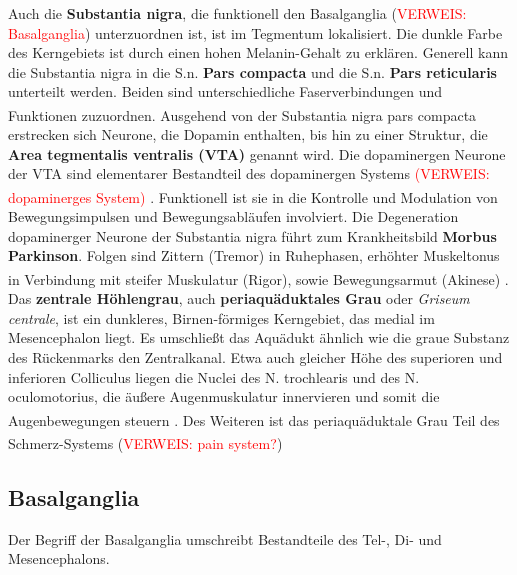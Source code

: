 \documentclass[12pt,a4paper,pdftex]{article}
\begin{document}
\noindent Auch die \textbf{Substantia nigra}, die funktionell den Basalganglia (\textcolor{red}{VERWEIS: Basalganglia}) unterzuordnen ist, ist im Tegmentum lokalisiert. Die dunkle Farbe des Kerngebiets ist durch einen hohen Melanin-Gehalt zu erklären. Generell kann die Substantia nigra in die S.n. \textbf{Pars compacta} und die S.n. \textbf{Pars reticularis} unterteilt werden. Beiden sind unterschiedliche Faserverbindungen und Funktionen zuzuordnen\textsuperscript{\cite[6]{trepel2011neuroanatomie}}. 
Ausgehend von der Substantia nigra pars compacta erstrecken sich Neurone, die Dopamin enthalten, bis hin zu einer Struktur, die \textbf{Area tegmentalis ventralis (VTA)} genannt wird. Die dopaminergen Neurone der VTA sind elementarer Bestandteil des dopaminergen Systems \textcolor{red}{(VERWEIS: dopaminerges System)} \textsuperscript{\cite[9]{crossman2014neuroanatomy}}. Funktionell ist sie in die Kontrolle und Modulation von Bewegungsimpulsen und Bewegungsabläufen involviert. Die Degeneration dopaminerger Neurone der Substantia nigra führt zum Krankheitsbild \textbf{Morbus Parkinson}. Folgen sind Zittern (Tremor) in Ruhephasen, erhöhter Muskeltonus in Verbindung mit steifer Muskulatur (Rigor), sowie Bewegungsarmut (Akinese) \textsuperscript{\cite[6]{trepel2011neuroanatomie}}. \\

\noindent Das \textbf{zentrale Höhlengrau}, auch \textbf{periaquäduktales Grau} oder \textit{Griseum centrale}, ist ein dunkleres, Birnen-förmiges  Kerngebiet, das medial im Mesencephalon liegt. Es umschließt das Aquädukt ähnlich wie die graue Substanz des Rückenmarks den Zentralkanal. Etwa auch gleicher Höhe des superioren und inferioren Colliculus liegen die Nuclei des N. trochlearis und des N. oculomotorius, die äußere Augenmuskulatur innervieren und somit die Augenbewegungen steuern \textsuperscript{\cite[9]{crossman2014neuroanatomy}}. Des Weiteren ist das periaquäduktale Grau Teil des Schmerz-Systems (\textcolor{red}{VERWEIS: pain system?}) \textsuperscript{\cite[25]{paxinos2014rat}}


\subsection{Basalganglia}
\label{subsec:Basalganglia} 

Der Begriff der Basalganglia umschreibt Bestandteile des Tel-, Di- und Mesencephalons.
\end{document}
